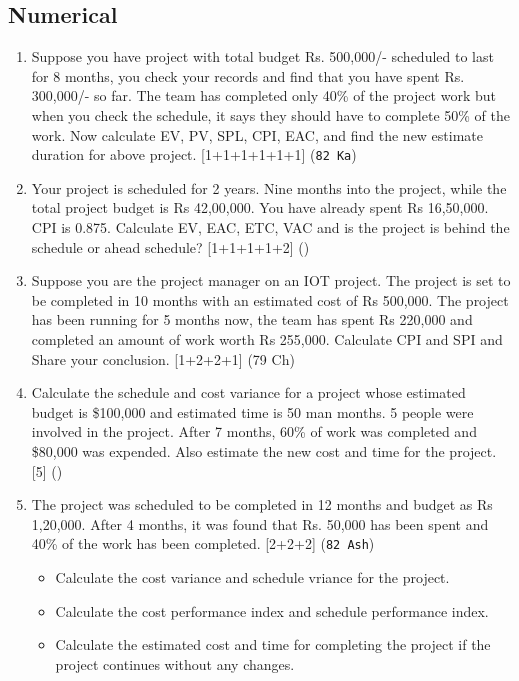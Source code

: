 \documentclass[12pt]{article}
\begin{document}
  \subsection{Numerical}
    \begin{enumerate}
      \item Suppose you have project with total budget Rs. 500,000/- scheduled to last for 8 months, you check your records and find that you have spent Rs. 300,000/- so far. The team has completed only 40\% of the project work but when you check the schedule, it says they should have to complete 50\% of the work. Now calculate EV, PV, SPL, CPI, EAC, and find the new estimate duration for above project. \hfill [1+1+1+1+1+1] (\texttt{82 Ka})

      \item Your project is scheduled for 2 years. Nine months into the project, while the total project budget is Rs 42,00,000. You have already spent Rs 16,50,000. CPI is 0.875. Calculate EV, EAC, ETC, VAC and is the project is behind the schedule or ahead schedule? \hfill [1+1+1+1+2] ()

      \item Suppose you are the project manager on an IOT project. The project is set to be completed in 10 months with an estimated cost of Rs 500,000. The project has been running for 5 months now, the team has spent Rs 220,000 and completed an amount of work worth Rs 255,000. Calculate CPI and SPI and Share your conclusion. \hfill [1+2+2+1] (79 Ch)

      \item Calculate the schedule and cost variance for a project whose estimated budget is \$100,000 and estimated time is 50 man months. 5 people were involved in the project. After 7 months, 60\% of work was completed and \$80,000 was expended. Also estimate the new cost and time for the project. \hfill [5] ()

      \item The project was scheduled to be completed in 12 months and budget as Rs 1,20,000. After 4 months, it was found that Rs. 50,000 has been spent and 40\% of the work has been completed. \hfill [2+2+2] (\texttt{82 Ash})
      \begin{itemize}[noitemsep]
        \item Calculate the cost variance and schedule vriance for the project.
        \item Calculate the cost performance index and schedule performance index.
        \item Calculate the estimated cost and time for completing the project if the project continues without any changes.
      \end{itemize}


\end{enumerate}
\end{document}
